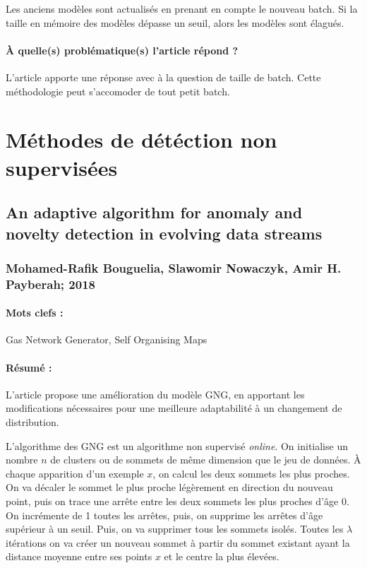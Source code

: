 \documentclass[11pt,a4paper]{report}
\begin{document}
Les anciens modèles sont actualisés en prenant en compte le nouveau batch. Si la taille en mémoire des modèles dépasse un seuil, alors les modèles sont élagués.

\paragraph{À quelle(s) problématique(s) l'article répond ?} L'article apporte une réponse avec à la question de taille de batch. Cette méthodologie peut s'accomoder de tout petit batch.

\newpage






\section{Méthodes de détéction non supervisées}

\subsection{An adaptive algorithm for anomaly and novelty detection in evolving data streams}
\subsubsection{Mohamed-Rafik Bouguelia, Slawomir Nowaczyk, Amir H. Payberah; 2018}

\paragraph{Mots clefs :}Gas Network Generator, Self Organising Maps

\paragraph{Résumé :}L'article propose une amélioration du modèle GNG, en apportant les modifications nécessaires pour une meilleure adaptabilité à un changement de distribution.

L'algorithme des GNG est un algorithme non supervisé \textit{online}. On initialise un nombre $n$ de clusters ou de sommets de même dimension que le jeu de données. À chaque apparition d'un exemple $x$, on calcul les deux sommets les plus proches. On va décaler le sommet le plus proche légèrement en direction du nouveau point, puis on trace une arrête entre les deux sommets les plus proches d'âge 0. On incrémente de 1 toutes les arrêtes, puis, on supprime les arrêtes d'âge supérieur à un seuil. Puis, on va supprimer tous les sommets isolés. Toutes les $\lambda$ itérations on va créer un nouveau sommet à partir du sommet existant ayant la distance moyenne entre ses points $x$ et le centre la plus élevées.
\end{document}
